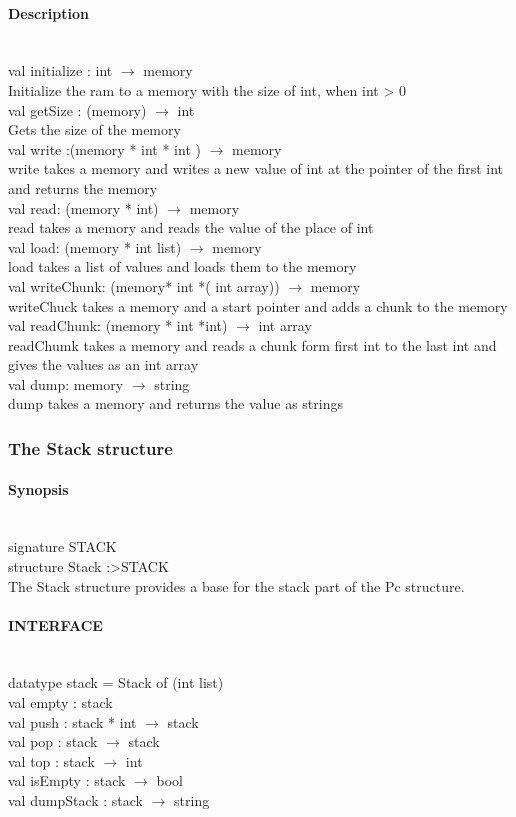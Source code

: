 \documentclass{article}
\begin{document}
\paragraph{Description} \
\\
val initialize : int $\rightarrow$ memory \\
	Initialize the ram to a memory with the size of int, when int > 0
\\
val getSize : (memory) $\rightarrow$ int\\
		Gets the size of the memory
\\
val write :(memory * int * int ) $\rightarrow$ memory\\
		write takes a memory and writes a new value of int at the pointer of the first
		int and returns the memory
\\
val read: (memory * int) $\rightarrow$ memory\\
		read takes a memory and reads the value of the place of int
\\
val load: (memory * int list) $\rightarrow$ memory\\
		load takes a list of values and loads them to the memory
\\
val writeChunk: (memory* int *( int array)) $\rightarrow$ memory \\
		writeChuck takes a memory and a start pointer and adds a chunk to the memory
\\
val readChunk: (memory * int *int) $\rightarrow$ int array \\
		readChumk takes a memory and reads a chunk form first int to the last int and gives the values as an int array
\\
val dump: memory $\rightarrow$ string\\
		dump takes a memory and returns the value as strings

\subsubsection{The Stack structure}
\paragraph{Synopsis}\
\\
signature STACK \\
structure Stack :\textgreater STACK
\\
The Stack structure provides a base for the stack part of the Pc structure.

\paragraph{INTERFACE}\
\\
	datatype stack = Stack of (int list)\\
	val empty : stack \\
	val push : stack * int $\rightarrow$ stack\\
	val pop : stack $\rightarrow$ stack\\
	val top : stack $\rightarrow$ int\\
	val isEmpty : stack $\rightarrow$ bool \\
	val dumpStack : stack $\rightarrow$ string\\
\end{document}
